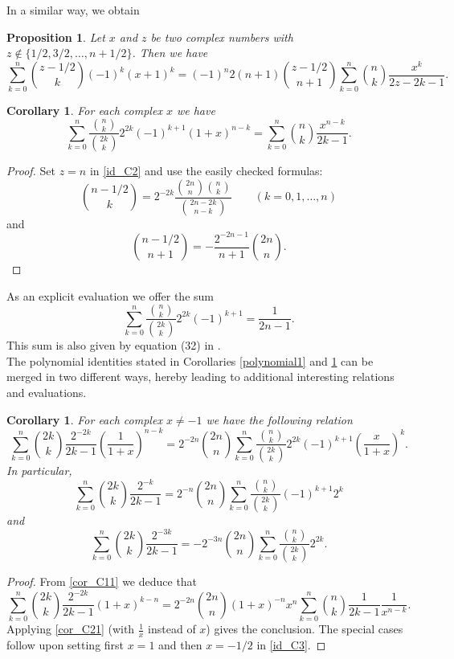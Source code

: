 \documentclass[10pt,a4paper]{amsart}
\numberwithin{equation}{section}
\newtheorem{proposition}[thm]{Proposition}
\newtheorem{corollary}[thm]{Corollary}
\begin{document}
In a similar way, we obtain

\begin{proposition}
Let $x$ and $z$ be two complex numbers with $z\notin\{1/2,3/2,\ldots,n+1/2\}$. Then we have
\begin{equation}\label{id_C2}
\sum_{k=0}^n \binom{z-1/2}{k}(-1)^k(x+1)^k= (-1)^n 2(n+1) \binom{z-1/2}{n+1}\sum_{k=0}^n \binom{n}{k} \frac{x^k}{2z-2k-1}.
\end{equation}
\end{proposition}

\begin{corollary}\label{polynomial2}
For each complex $x$ we have
\begin{equation}\label{cor_C21}
\sum_{k=0}^n \frac{\binom{n}{k}}{\binom{2k}{k}} 2^{2k} (-1)^{k+1} (1+x)^{n-k} = \sum_{k=0}^n \binom{n}{k} \frac{x^{n-k}}{2k-1}.
\end{equation}
\end{corollary}
\begin{proof}
Set $z=n$ in \eqref{id_C2} and use the easily checked formulas:
$$\binom{n-1/2}{k}=2^{-2k}\frac{\binom{2n}{n}\binom{n}{k}}{\binom{2n-2k}{n-k}}\qquad (k=0,1,\ldots,n)$$
and
$$\binom{n-1/2}{n+1}=-\frac{2^{-2n-1}}{n+1}\binom{2n}{n}.$$
\end{proof}

As an explicit evaluation we offer the sum
$$\sum_{k=0}^n \frac{\binom{n}{k}}{\binom{2k}{k}} 2^{2k} (-1)^{k+1} = \frac{1}{2n-1}.$$
This sum is also given by equation (32) in \cite{Adegoke}.\\ 

The polynomial identities stated in Corollaries \ref{polynomial1} and \ref{polynomial2} can be merged in two
different ways, hereby leading to additional interesting relations and evaluations.

\begin{corollary}
For each complex $x\neq -1$ we have the following relation
\begin{equation}\label{id_C3}
\sum_{k=0}^n \binom{2k}{k} \frac{2^{-2k}}{2k-1} \left (\frac{1}{1+x}\right )^{n-k}
= 2^{-2n} \binom{2n}{n} \sum_{k=0}^n \frac{\binom{n}{k}}{\binom{2k}{k}} 2^{2k} (-1)^{k+1}\left ( \frac{x}{1+x}\right )^{k}.
\end{equation}
In particular,
\begin{equation*}
\sum_{k=0}^n \binom{2k}{k} \frac{2^{-k}}{2k-1} =2^{-n}\binom{2n}{n}\sum_{k=0}^n\frac{\binom{n}{k}}{\binom{2k}{k}}(-1)^{k+1} 2^{k}
\end{equation*}
and
\begin{equation*}
\sum_{k=0}^n \binom{2k}{k} \frac{2^{-3k}}{2k-1} = - 2^{-3n} \binom{2n}{n} \sum_{k=0}^n \frac{\binom{n}{k}}{\binom{2k}{k}}2^{2k}.
\end{equation*}
\end{corollary}
\begin{proof}
From \eqref{cor_C11} we deduce that
\[ \sum_{k=0}^n \binom{2k}{k}\frac{2^{-2k}}{2k-1}(1+x)^{k-n}=2^{-2n}\binom{2n}{n}(1+x)^{-n}x^n\sum_{k=0}^n\binom{n}{k}\frac{1}{2k-1}\frac{1}{x^{n-k}}.\]
Applying \eqref{cor_C21} (with $\frac{1}{x}$ instead of $x$) gives the conclusion. The special cases follow upon setting first $x=1$ and then $x=-1/2$ in \eqref{id_C3}.
\end{proof}
\end{document}
